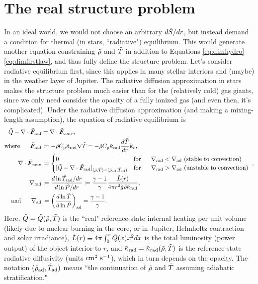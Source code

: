 \documentclass[12pt]{article}
\numberwithin{equation}{section}
\begin{document}
\section{The real structure problem}
In an ideal world, we would not choose an arbitrary $d\tilde{S}/dr$, but instead demand a condition for thermal (in stars, ``radiative") equilibrium. This would generate another equation constraining $\tilde{\rho}$ and $\tilde{T}$ in addition to Equations \eqref{eq:dimhydro}--\eqref{eq:dimfirstlaw}, and thus fully define the structure problem. Let's consider radiative equilibrium first, since this applies in many stellar interiors and (maybe) in the weather layer of Jupiter. The radiative diffusion approximation in stars makes the structure problem much easier than for the (relatively cold) gas giants, since we only need consider the opacity of a fully ionized gas (and even then, it's complicated). Under the radiative diffusion approximation (and making a mixing-length assumption), the equation of radiative equilibrium is
\begin{subequations}\label{eq:dimradequil}
\begin{align}
	\heattilde - \Div\fradtilde &= \Div\fconvtilde\label{eq:dimradequil1},\\
	\where \fradtilde &\define  -\rhotilde \cpcap\kradtilde \nabla\tmptilde=-\rhotilde \cpcap\kradtilde \frac{d\tmptilde}{dr}\er,\label{eq:dimradequil2}\\
	 \Div\fconvtilde &\define \begin{cases} 0 \five &\text{for}\five \nabla_{\rm rad} <\nabla_{\rm ad}\ \text{(stable to convection)}\\
	[\heattilde - \Div\fradtilde]_{(\rhotilde,\tmptilde)=(\rhotilde_{\rm ad}, \tmptilde_{\rm ad})}&\text{for}\five \nabla_{\rm rad} >\nabla_{\rm ad}\ \text{(unstable to convection)}\
		\end{cases},\label{eq:dimradequil3}\\
		\nabla_{\rm rad}&\define \frac{d\ln\tmptilde_{\rm rad}/dr}{d\ln\prstilde/dr} \define \frac{\gamma-1}{\gamma}\frac{\lumtilde\ofr}{4\pi r^2 \gtilde \rhotilde \kradtilde},\label{eq:dimradequil4}\\
		\andd \nabla_{\rm ad}&\define  \left(\frac{d\ln\tmptilde}{d\ln\prstilde}\right)_{\rm ad} = \frac{\gamma-1}{\gamma}.
\end{align}
\end{subequations}
Here, $\tilde{Q}=\tilde{Q}(\tilde{\rho},\tilde{T})$ is the ``real" reference-state internal heating per unit volume (likely due to nuclear burning in the core, or in Jupiter, Helmholtz contraction and solar irradiance), $\tilde{L}(r)\equiv 4\pi\int_0^r \tilde{Q}(x) x^2dx$ is the total luminosity (power output) of the object interior to $r$, and $\tilde{\kappa}_{\rm rad}=\tilde{\kappa}_{\rm rad}(\tilde{\rho},\tilde{T})$ is the reference-state radiative diffusivity (units $\rm{cm^2\ s^{-1}}$), which in turn depends on the opacity. The notation $(\tilde{\rho}_{\rm ad}, \tilde{T}_{\rm ad})$ means ``the continuation of $\tilde{\rho}$ and $\tilde{T}$ assuming adiabatic stratification."
\end{document}
